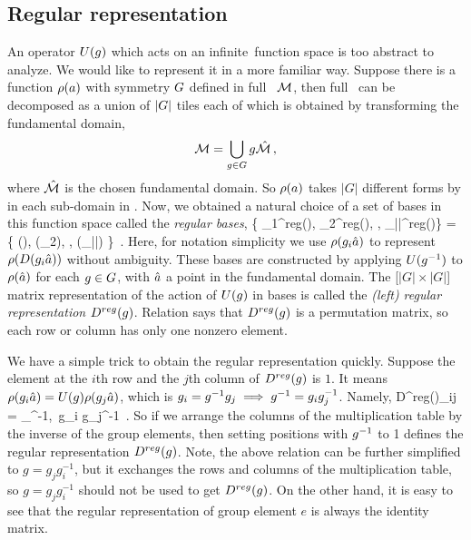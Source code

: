 \subsection{Regular representation}
An operator $U(g)$ which acts on an infinite\dmn\ function space
is too abstract to analyze.
We would like to represent it in a more familiar way.
Suppose there is a function $\rho(a)$ with symmetry $G$ defined in full
\statesp\ $\mathcal{M}$, then full \statesp\ can be decomposed as a union
of $|G|$ tiles each of which is obtained by transforming the fundamental
domain,
\begin{equation}
  \label{eq:domain}
  \mathcal{M} =  \bigcup_{g\in G}g\hat{\mathcal{M}}
  \,,
\end{equation}
where $\hat{\mathcal{M}}$ is the chosen fundamental domain.
So $\rho(a)$ takes $|G|$ different forms by  in each sub-domain
in . Now, we obtained a natural choice of a set of bases in this
function space called the \emph{regular bases},
\beq
\label{eq:RegBasis}
\{ \rho_1^{reg}(\sspRed), \rho_2^{reg}(\sspRed), %
\cdots, \rho_{|\Group|}^{reg}(\sspRed)\}
=
\{
\rho(\sspRed), \rho(\LieEl_2\sspRed), %
\cdots, \rho(\LieEl_{|\Group|}\sspRed) \}
\,.
\eeq
Here, for notation simplicity we use
$\rho(g_i\hat{a})$ to represent $\rho(D(g_i\hat{a}))$ without
ambiguity.
These bases are
constructed by applying $U(g^{-1})$ to $\rho(\hat{a})$ for each
$g\in G$, with $\hat{a}$ a point in the fundamental domain.
The [$|G|\!\times\!|G|$] matrix representation of the
action of $U(g)$ in bases  is called the \emph{(left)
regular representation} $D^{reg}(g)$. Relation  says that
$D^{reg}(g)$ is a permutation matrix, so each row or column has only one nonzero
element.

We have a simple trick to obtain the regular representation quickly.
Suppose the element at the $i$th row and
the $j$th column of $D^{reg}(g)$
is $1$. It means
$\rho(g_i\hat{a}) = U(g) \rho(g_j\hat{a})$, which
is $g_i=g^{-1}g_j \implies g^{-1} = g_i g_j^{-1}$. Namely,
\beq
D^{reg}(\LieEl)_{ij} = \delta_{\LieEl^{-1},\, g_i g_j^{-1}}
\,.
So if we arrange the
columns of the multiplication table by the inverse of the group elements,
then setting positions with $g^{-1}$ to 1 defines the regular
representation $D^{reg}(g)$. Note, the above relation can
be further simplified to $g = g_jg_i^{-1}$, but it exchanges the rows and
columns of the multiplication table, so $g = g_jg_i^{-1}$
should not be used to get $D^{reg}(g)$.
On the other hand, it is easy to see
that the regular representation of group element $e$ is always the identity matrix.


